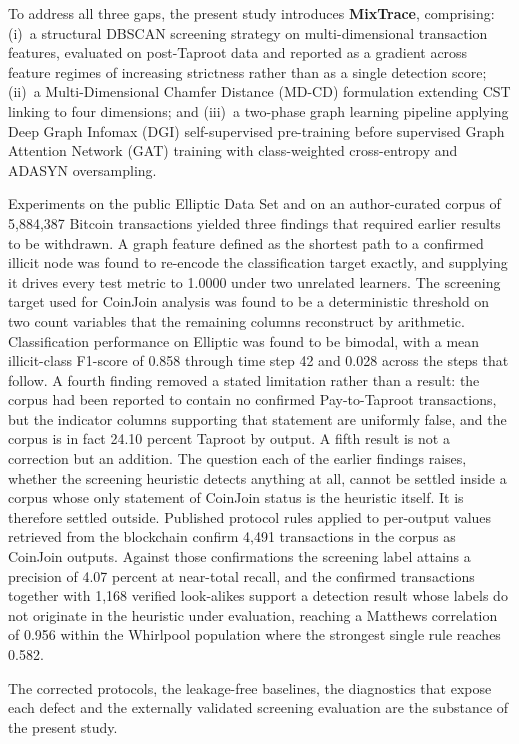 \documentclass[12pt,a4paper]{article}
\begin{document}
To address all three gaps, the present study introduces
\textbf{MixTrace}, comprising: (i)~a structural DBSCAN
screening strategy on multi-dimensional transaction features,
evaluated on post-Taproot data and reported as a gradient across
feature regimes of increasing strictness rather than as a single
detection score;
(ii)~a Multi-Dimensional Chamfer Distance (MD-CD) formulation
extending CST linking to four dimensions; and (iii)~a
two-phase graph learning pipeline applying Deep Graph Infomax
(DGI) self-supervised pre-training before supervised Graph
Attention Network (GAT) training with class-weighted
cross-entropy and ADASYN oversampling.

Experiments on the public Elliptic Data Set and on an
author-curated corpus of 5,884,387 Bitcoin transactions yielded
three findings that required earlier results to be withdrawn. A
graph feature defined as the shortest path to a confirmed illicit
node was found to re-encode the classification target exactly,
and supplying it drives every test metric to 1.0000 under two
unrelated learners. The screening target used for CoinJoin
analysis was found to be a deterministic threshold on two count
variables that the remaining columns reconstruct by arithmetic.
Classification performance on Elliptic was found to be bimodal,
with a mean illicit-class F1-score of 0.858 through time step 42
and 0.028 across the steps that follow. A fourth finding removed
a stated limitation rather than a result: the corpus had been
reported to contain no confirmed Pay-to-Taproot transactions, but
the indicator columns supporting that statement are uniformly
false, and the corpus is in fact 24.10 percent Taproot by output.
A fifth result is not a correction but an addition. The question
each of the earlier findings raises, whether the screening
heuristic detects anything at all, cannot be settled inside a
corpus whose only statement of CoinJoin status is the heuristic
itself. It is therefore settled outside. Published protocol rules
applied to per-output values retrieved from the blockchain
confirm 4{,}491 transactions in the corpus as CoinJoin outputs.
Against those confirmations the screening label attains a
precision of 4.07 percent at near-total recall, and the confirmed
transactions together with 1{,}168 verified look-alikes support a
detection result whose labels do not originate in the heuristic
under evaluation, reaching a Matthews correlation of 0.956 within
the Whirlpool population where the strongest single rule reaches
0.582.

The corrected protocols, the leakage-free baselines, the
diagnostics that expose each defect and the externally validated
screening evaluation are the substance of the present study.
\end{document}
